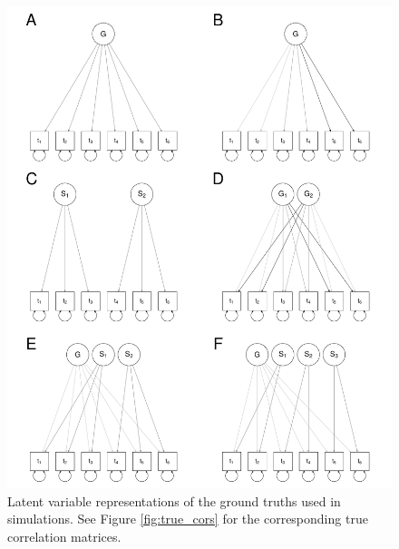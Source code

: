 \documentclass[man, 12pt]{apa7} %
\begin{document}
\begin{figure}[htbp]
    \centering  %
    \includegraphics[width=\linewidth, height=1.1\linewidth, keepaspectratio]{_figs/factor_tree.pdf}
    \caption{Latent variable representations of the ground truths used in simulations.  See Figure \ref{fig:true_cors} for the corresponding true correlation matrices.}  %
    \label{fig:fac_st}
\end{figure}
\end{document}

